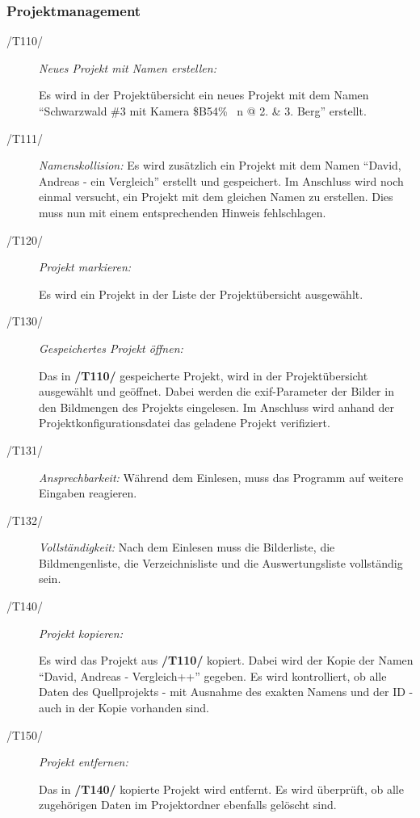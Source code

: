 	\subsubsection{Projektmanagement}
	
		\begin{description}
		
			\item[/T110/] \textit{Neues Projekt mit Namen erstellen:}\par Es wird in der Projektübersicht ein neues Projekt mit dem Namen "`Schwarzwald \#3 mit Kamera \$B54\% ~n @ 2. \& 3. Berg"' erstellt.
			
			\item[/T111/] \textit{Namenskollision:} Es wird zusätzlich ein Projekt mit dem Namen "`David, Andreas - ein Vergleich"' erstellt und gespeichert. Im Anschluss wird noch einmal versucht, ein Projekt mit dem gleichen Namen zu erstellen. Dies muss nun mit einem entsprechenden Hinweis fehlschlagen.
				
			\item[/T120/] \textit{Projekt markieren:}\par Es wird ein Projekt in der Liste der Projektübersicht ausgewählt.
				
			\item[/T130/] \textit{Gespeichertes Projekt öffnen:}\par Das in \textbf{/T110/} gespeicherte Projekt, wird in der Projektübersicht ausgewählt und geöffnet. Dabei werden die \gls{exif}-Parameter der Bilder in den Bildmengen des Projekts eingelesen. Im Anschluss wird anhand der Projektkonfigurationsdatei das geladene Projekt verifiziert.

			\item[/T131/] \textit{Ansprechbarkeit:}	Während dem Einlesen, muss das Programm auf weitere Eingaben reagieren.
			
			\item[/T132/] \textit{Vollständigkeit:} Nach dem Einlesen muss die Bilderliste, die Bildmengenliste, die Verzeichnisliste und die Auswertungsliste vollständig sein.
			
			\item[/T140/] \textit{Projekt kopieren:}\par Es wird das Projekt aus \textbf{/T110/} kopiert. Dabei wird der Kopie der Namen "`David, Andreas - Vergleich++"' gegeben. Es wird kontrolliert, ob alle Daten des Quellprojekts - mit Ausnahme des exakten Namens und der ID - auch in der Kopie vorhanden sind.
				
			\item[/T150/] \textit{Projekt entfernen:}\par Das in \textbf{/T140/} kopierte Projekt wird entfernt. Es wird überprüft, ob alle zugehörigen Daten im Projektordner ebenfalls gelöscht sind.
		
		\end{description}
	
